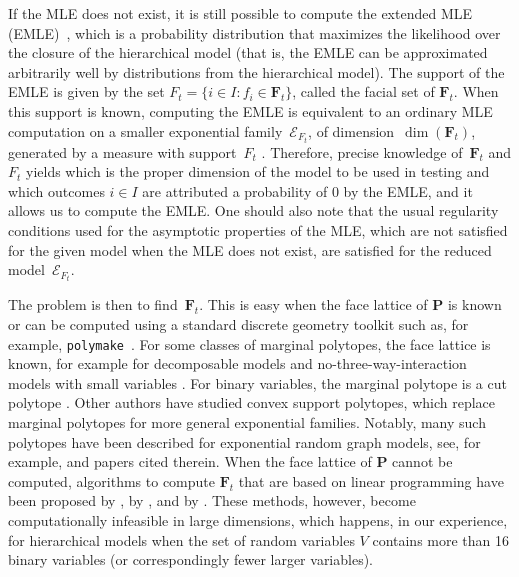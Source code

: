 \documentclass[aos,noinfoline]{imsart}
\newcommand{\Ecal}{\mathcal{E}}
\newcommand{\Fbf}{\mathbf{F}}
\newcommand{\Pbf}{\mathbf{P}}
\theoremstyle{remark}
\theoremstyle{definition}
\begin{document}
If the MLE does not exist, it is still possible to compute the extended MLE
(EMLE)~\citep{Barndorff:exponential_families,Lauritzen:Graphical_models,CsiszarMatus08:EMLE}, which is a probability
distribution that maximizes the likelihood over the closure of the hierarchical model (that is, the EMLE can be
approximated arbitrarily well by distributions from the hierarchical model).
The support of the EMLE is
given by the set $F_t=\{i\in I: f_{i}\in\Fbf_{t}\}$, called the facial set of $\Fbf_t$.  When this support is known, computing the EMLE is equivalent to an ordinary
MLE computation on a smaller exponential family~$\Ecal_{F_{t}}$, of dimension~$\dim(\Fbf_{t})$,
 generated by a measure with support~$F_t$ \citep{Geyer09:Likelihood_inference_in_exponential_families}. 
Therefore, precise knowledge of~$\Fbf_{t}$ and $F_t$ yields which is the proper dimension of the model to be used in testing and which outcomes $i\in I$ are attributed a probability of $0$ by the EMLE,
and it allows us to compute the EMLE. One should also note that the usual regularity conditions used for the asymptotic properties of the MLE, which are not satisfied for the given model when the MLE does not exist, are satisfied for the reduced model~$\Ecal_{F_{t}}$.

The problem is then to find~$\Fbf_{t}$.  
This is easy when the face lattice of $\Pbf$ is known or can be computed using a standard discrete geometry toolkit such as, for example, \texttt{polymake}~\citep{polymake}.
For some classes of marginal polytopes, the face lattice is known, for example for decomposable models and no-three-way-interaction models with small variables \citep{Vlach86:3D_planar_transportation_problem}.
For binary variables, the marginal polytope is a cut polytope \citep{DezaLaurent09:Cuts_and_metrics}.
Other authors have studied convex support polytopes, which replace marginal polytopes for more general exponential families.
Notably, many such polytopes have been described for exponential random graph models, see, for example, \cite{KarwaSlavkovic16:MLE_in_betamodels} and papers cited therein.
When the face lattice of $\Pbf$  cannot be computed, algorithms to compute $\Fbf_{t}$ that are based on linear programming have been proposed by \citet{EFRS06:Polyhedral_conditions_MLE}, by \citet{Geyer09:Likelihood_inference_in_exponential_families},
and by \citet{FienbergRinaldo12:MLE_in_loglinear_models}. 
These methods, however, become computationally infeasible in large dimensions, which happens, in our experience, for
hierarchical models when the set of random variables $V$ contains more than 16 binary variables (or correspondingly
fewer larger variables).
\end{document}

